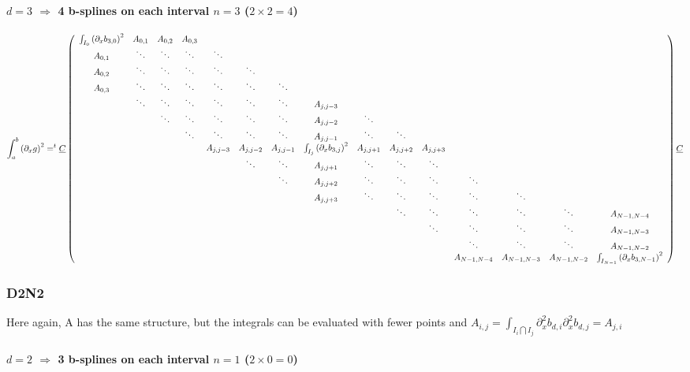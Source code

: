 \documentclass[paper=a4, fontsize=11pt]{book}
\numberwithin{equation}{section}		%
\numberwithin{figure}{section}			%
\numberwithin{table}{section}				%
\begin{document}
\begin{landscape}
\paragraph{\textbf{$d=3$ $\Rightarrow$ 4 b-splines on each interval $n=3$ ($2\times2=4$)}}
$$
\int_{a}^{b} \left(\partial_xg\right)^2 = ^t\underline{C} \left(\begin{array}{ccccccccccccccc}
\int_{I_0}\left(\partial_xb_{3,0}\right)^2&A_{0,1}&A_{0,2}&A_{0,3}&&&&&&&&&&&\\ A_{0,1}&\ddots&\ddots&\ddots&\ddots&&&&&&&&&&\\ A_{0,2}&\ddots&\ddots&\ddots&\ddots&\ddots&&&&&&&&&\\ A_{0,3}&\ddots&\ddots&\ddots&\ddots&\ddots&\ddots&&&&&&&&\\
&\ddots&\ddots&\ddots&\ddots&\ddots&\ddots&A_{j,j-3}&&&&&&&\\ &&\ddots&\ddots&\ddots&\ddots&\ddots&A_{j,j-2}&\ddots&&&&&&\\ &&&\ddots&\ddots&\ddots&\ddots&A_{j,j-1}&\ddots&\ddots&&&&&\\
&&&&A_{j,j-3}&A_{j,j-2}&A_{j,j-1}&\int_{I_j}\left(\partial_xb_{3,j}\right)^2&A_{j,j+1}&A_{j,j+2}&A_{j,j+3}&&&&\\
&&&&&\ddots&\ddots&A_{j,j+1}&\ddots&\ddots&\ddots&&&&\\ &&&&&&\ddots&A_{j,j+2}&\ddots&\ddots&\ddots&\ddots&&&\\ &&&&&&&A_{j,j+3}&\ddots&\ddots&\ddots&\ddots&\ddots&&\\
&&&&&&&&&\ddots&\ddots&\ddots&\ddots&\ddots&A_{N-1,N-4}\\ &&&&&&&&&&\ddots&\ddots&\ddots&\ddots&A_{N-1,N-3}\\
&&&&&&&&&&&\ddots&\ddots&\ddots&A_{N-1,N-2}\\ &&&&&&&&&&&A_{N-1,N-4}&A_{N-1,N-3}&A_{N-1,N-2}&\int_{I_{N-1}}\left(\partial_xb_{3,N-1}\right)^2
\end{array}\right) \underline{C}\\
$$

\subsubsection{D2N2}
Here again, A has the same structure, but the integrals can be evaluated with fewer points and $A_{i,j} = \int_{I_i\bigcap I_j}\partial^2_xb_{d,i}\partial^2_xb_{d,j} = A_{j,i}$
\paragraph{\textbf{$d=2$ $\Rightarrow$ 3 b-splines on each interval $n=1$ ($2\times0=0$)}}

\end{landscape}
\end{document}
